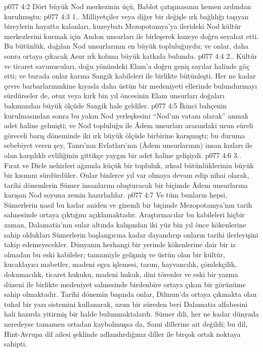 \vs p077 4:2 Dört büyük Nod merkezinin üçü, Bablot çatışmasının hemen ardından kurulmuştu:
\vs p077 4:3 1.\bibnobreakspace {}. Milliyetçiler veya diğer bir değişle ırk bağlılığı taşıyan bireylerin hayatta kalanları, kuzeybatı Mezopotamya’ya ilerideki Nod kültür merkezlerini kurmak için Andon unsurları ile birleşerek kuzeye doğru seyahat etti. Bu bütünlük, dağılan Nod unsurlarının en büyük topluluğuydu; ve onlar, daha sonra ortaya çıkacak Asur ırk koluna büyük katkıda bulundu.
\vs p077 4:4 2.\bibnobreakspace {}. Kültür ve ticaret savunucuları, doğu yönündeki Elam’a doğru geniş sayılar halinde göç etti; ve burada onlar karma Sangik kabileleri ile birlikte bütünleşti. Her ne kadar çevre barbarlarınınkine kıyasla daha üstün bir medeniyeti ellerinde bulundurmayı sürdürseler de, otuz veya kırk bin yıl öncesinin Elam unsurları doğaları bakımından büyük ölçüde Sangik hale geldiler.
\vs p077 4:5 İkinci bahçenin kurulmasından sonra bu yakın Nod yerleşkesini “Nod’un vatanı olarak” anmak adet haline gelmişti; ve Nod topluluğu ile Âdem unsurları arasındaki uzun süreli göreceli barış döneminde iki ırk büyük ölçüde birbirine karışmıştı; bu duruma sebebiyet veren şey, Tanrı’nın Evlatları’nın (Âdem unsurlarının) insan kızları ile olan karşılıklı evliliğinin gittikçe yaygın bir adet haline gelişiydi.
\vs p077 4:6 3.\bibnobreakspace {}. Fırat ve Dicle nehirleri ağzında küçük bir topluluk, ırksal bütünlüklerinin büyük bir kısmını sürdürdüler. Onlar binlerce yıl var olmaya devam edip nihai olarak, tarihi dönemlerin Sümer insanlarını oluşturacak bir biçimde Âdem unsurlarına karışan Nod soyuna zemin hazırladılar.
\vs p077 4:7 Ve tüm bunların hepsi, Sümerlerin nasıl bu kadar aniden ve gizemli bir biçimde Mezopotamya’nın tarih sahnesinde ortaya çıktığını açıklamaktadır. Araştırmacılar bu kabileleri hiçbir zaman, Dalamatia’nın sular altında kalışından iki yüz bin yıl önce kökenlerine sahip oldukları Sümerlerin başlangıcına kadar dayandırıp onların tarihi ilerleyişini takip edemeyecekler. Dünyanın herhangi bir yerinde kökenlerine dair bir iz olmadan bu eski kabileler; tamamiyle gelişmiş ve üstün olan bir kültür, kucaklayıcı mabetler, madeni eşya işlemesi, tarım, hayvancılık, çömlekçilik, dokumacılık, ticaret hukuku, madeni hukuk, dini törenler ve eski bir yazma düzeni ile birlikte medeniyet sahnesinde birdenbire ortaya çıkan bir görünüme sahip olmaktadır. Tarihi dönemin başında onlar, Dilmun’da ortaya çıkmakta olan tuhaf bir yazı sistemini kullanarak, uzun bir süreden beri Dalamatia alfabesini hali hazırda yitirmiş bir halde bulunmaktalardı. Sümer dili, her ne kadar dünyada neredeyse tamamen ortadan kaybolmuşsa da, Sami dillerine ait değildi; bu dil, Hint\hyp{}Avrupa dil ailesi şeklinde adlandırdığınız diller ile birçok ortak noktaya sahipti.

